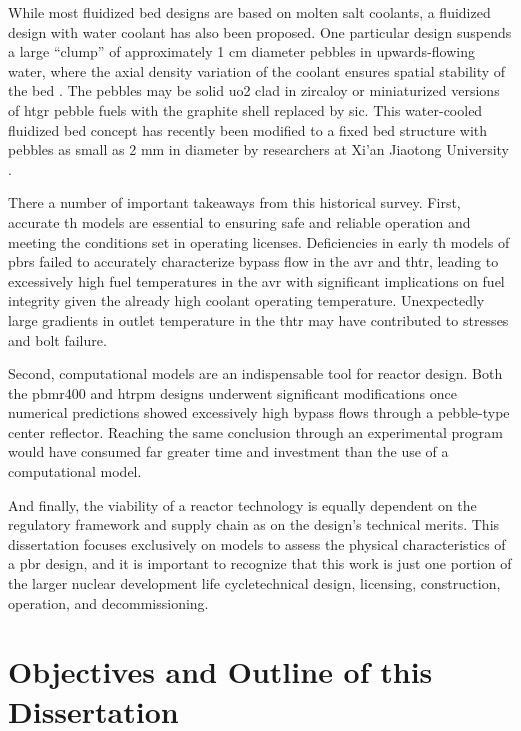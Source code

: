 While most fluidized bed designs are based on molten salt coolants, a fluidized design with water coolant has also been proposed. One particular design suspends a large ``clump'' of approximately 1 \si{\centi\meter} diameter pebbles in upwards-flowing water, where the axial density variation of the coolant ensures spatial stability of the bed \cite{sefidvash, sefidvash_1996}. The pebbles may be solid \gls{uo2} clad in zircaloy or miniaturized versions of \gls{htgr} pebble fuels with the graphite shell replaced by \gls{sic}. This water-cooled fluidized bed concept has recently been modified to a fixed bed structure with pebbles as small as 2 \si{\milli\meter} in diameter by researchers at Xi'an Jiaotong University \cite{cai,li_pbwr}.

There a number of important takeaways from this historical survey. First, accurate \gls{th} models are essential to ensuring safe and reliable operation and meeting the conditions set in operating licenses. Deficiencies in early \gls{th} models of \glspl{pbr} failed to accurately characterize bypass flow in the \gls{avr} and \gls{thtr}, leading to excessively high fuel temperatures in the \gls{avr} with significant implications on fuel integrity given the already high coolant operating temperature. Unexpectedly large gradients in outlet temperature in the \gls{thtr} may have contributed to stresses and bolt failure.

Second, computational models are an indispensable tool for reactor design. Both the \gls{pbmr400} and \gls{htrpm} designs underwent significant modifications once numerical predictions showed excessively high bypass flows through a pebble-type center reflector. Reaching the same conclusion through an experimental program would have consumed far greater time and investment than the use of a computational model.

And finally, the viability of a reactor technology is equally dependent on the regulatory framework and supply chain as on the design's technical merits. This dissertation focuses exclusively on models to assess the physical characteristics of a \gls{pbr} design, and it is important to recognize that this work is just one portion of the larger nuclear development life cycle\mdash technical design, licensing, construction, operation, and decommissioning. 

\section{Objectives and Outline of this Dissertation}
\label{sec:outline}

